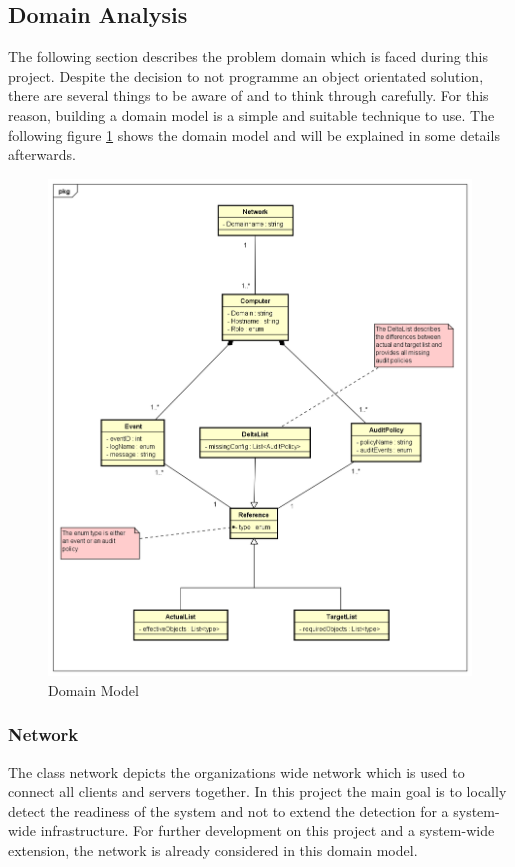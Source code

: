 \subsection{Domain Analysis} \label{DomainAnalysis}
The following section describes the problem domain which is faced during this project. Despite the decision to not programme an object orientated solution, there are several things to be aware of and to think through carefully. For this reason, building a domain model is a simple and suitable technique to use. The following figure \ref{fig:domainmodel} shows the domain model and will be explained in some details afterwards. 
\begin{figure}[H]
    \centering
    \includegraphics[width=0.95\linewidth]{assets/architecture/DomainModelSRI.png}
    \caption{Domain Model}\label{fig:domainmodel}
\end{figure}

\subsubsection{Network}
The class network depicts the organizations wide network which is used to connect all clients and servers together. In this project the main goal is to locally detect the readiness of the system and not to extend the detection for a system-wide infrastructure. For further development on this project and a system-wide extension, the network is already considered in this domain model.

